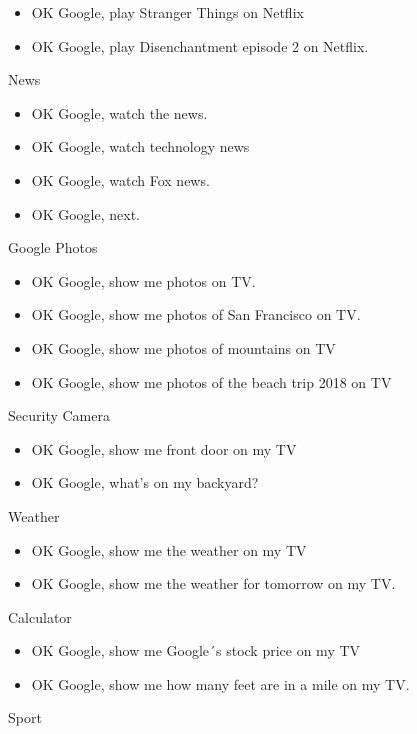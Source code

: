 \documentclass[
  letterpaper,
  DIV=11,
  numbers=noendperiod]{scrartcl}
\begin{document}
\begin{itemize}
\item
  OK Google, play Stranger Things on Netflix
\item
  OK Google, play Disenchantment episode 2 on Netflix.
\end{itemize}

News

\begin{itemize}
\item
  OK Google, watch the news.
\item
  OK Google, watch technology news
\item
  OK Google, watch Fox news.
\item
  OK Google, next.
\end{itemize}

Google Photos

\begin{itemize}
\item
  OK Google, show me photos on TV.
\item
  OK Google, show me photos of San Francisco on TV.
\item
  OK Google, show me photos of mountains on TV
\item
  OK Google, show me photos of the beach trip 2018 on TV
\end{itemize}

Security Camera

\begin{itemize}
\item
  OK Google, show me front door on my TV
\item
  OK Google, what's on my backyard?
\end{itemize}

Weather

\begin{itemize}
\item
  OK Google, show me the weather on my TV
\item
  OK Google, show me the weather for tomorrow on my TV.
\end{itemize}

Calculator

\begin{itemize}
\item
  OK Google, show me Google´s stock price on my TV
\item
  OK Google, show me how many feet are in a mile on my TV.
\end{itemize}

Sport
\end{document}
